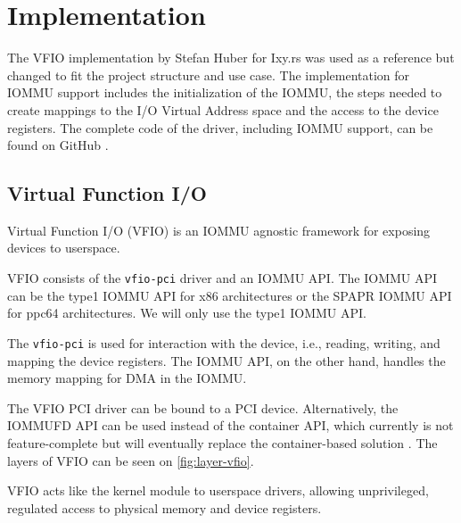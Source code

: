 \chapter{Implementation} \label{c:impl}

The VFIO implementation by Stefan Huber for Ixy.rs was used as a reference but changed to fit the project structure and use case. The implementation for IOMMU support includes the initialization of the IOMMU, the steps needed to create mappings to the I/O Virtual Address space and the access to the device registers. The complete code of the driver, including IOMMU support, can be found on GitHub \cite{vroomsource}.

\section{Virtual Function I/O}
Virtual Function I/O (VFIO) is an IOMMU agnostic framework for exposing devices to userspace.

VFIO consists of the \texttt{vfio-pci} driver and an IOMMU API. The IOMMU API can be the type1 IOMMU API for x86 architectures or the SPAPR IOMMU API for ppc64 architectures. We will only use the type1 IOMMU API.

The \texttt{vfio-pci} is used for interaction with the device, i.e., reading, writing, and mapping the device registers. The IOMMU API, on the other hand, handles the memory mapping for DMA in the IOMMU.

The VFIO PCI driver can be bound to a PCI device. Alternatively, the IOMMUFD API can be used instead of the container API, which currently is not feature-complete but will eventually replace the container-based solution \cite{vfiokerneldocs}. The layers of VFIO can be seen on \autoref{fig:layer-vfio}.

VFIO acts like the kernel module to userspace drivers, allowing unprivileged, regulated access to physical memory and device registers.

